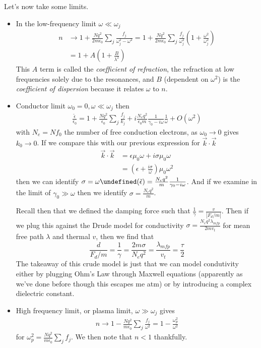 \documentclass[10pt]{report}
\let\Im\undefined
\DeclareMathOperator{\Im}{Im}
\newcommand{\abs}[1]{\left|#1\right|}
\begin{document}
Let's now take some limits. 
\begin{itemize}
    \item In the low-frequency limit $\omega \ll \omega_j$
        \begin{align}
            n &\to 1 + \frac{Nq^2}{2m\epsilon_0} \sum_{j}^{}\frac{f_j}{\omega_j^2 - \omega^2} = 1 + \frac{Nq^2}{2m\epsilon_0}\sum_{j}^{}\frac{f_j}{\omega_j^2}\left( 1 + \frac{\omega^2}{\omega_j^2} \right)\\
            &= 1 + A\left( 1 + \frac{B}{\lambda^2} \right)
        \end{align}
        This $A$ term is called the \emph{coefficient of refraction}, the refraction at low frequencies solely due to the resonances, and $B$ (dependent on $\omega^2$) is the \emph{coefficient of dispersion} because it relates $\omega$ to $n$. 
    \item Conductor limit $\omega_0 = 0, \omega \ll \omega_j$ then
        \begin{align}
            \frac{\tilde{\epsilon}}{\epsilon_0} = 1 + \frac{Nq^2}{\epsilon_0}\sum_{j}^{} \frac{f_j}{k_j} + i\frac{N_e q^2}{\epsilon_0 m}\frac{1}{\gamma_0 - i\omega}\frac{1}{\omega} + O(\omega^2)
        \end{align}
        with $N_e = Nf_0$ the number of free conduction electrons, as $\omega_0 \to 0$ gives $k_0 \to 0$. If we compare this with our previous expression for $\vec{k} \cdot \vec{k}$
        \begin{align}
            \vec{k} \cdot \vec{k} &= \epsilon \mu_0 \omega + i\sigma\mu_0\omega\\
            &= \left( \epsilon + \frac{i\sigma}{\omega} \right)\mu_0\omega^2
        \end{align}
        then we can identify $\sigma = \omega \Im(\tilde{\epsilon}) = \frac{N_e q^2}{m}\frac{1}{\gamma_0 - i\omega}$. And if we examine in the limit of $\gamma_0 \gg \omega$ then we identify $\boxed{\sigma = \frac{N_eq^2}{m}}$.

        Recall then that we defined the damping force such that $\frac{1}{\gamma} = \frac{v}{\abs{F_d/m}}$. Then if we plug this against the Drude model for conductivity $\sigma = \frac{N_eq^2\lambda_{mfp}}{2mv_t}$ for mean free path $\lambda$ and thermal $v$, then we find that
        \begin{equation}
            \frac{d}{F_d/m} = \frac{1}{\gamma} = \frac{2m\sigma}{N_eq^2} = \frac{\lambda_{mfp}}{v_t}  = \frac{\tau}{2}
        \end{equation}
        The takeaway of this crude model is just that we can model condutivity either by plugging Ohm's Law through Maxwell equations (apparently as we've done before though this escapes me atm) or by introducing a complex dielectric constant.
    \item High frequency limit, or plasma limit, $\omega \gg \omega_j$ gives
        \begin{align}
            n \to 1 - \frac{Nq^2}{m\epsilon_0}\sum_{j}^{}\frac{f_j}{\omega^2} = 1 - \frac{\omega_p^2}{\omega^2}
        \end{align}
        for $\omega_p^2 = \frac{Nq^2}{m\epsilon_0}\sum_{j}^{}f_j$. We then note that $n < 1$ thankfully.


\end{itemize}
\end{document}
